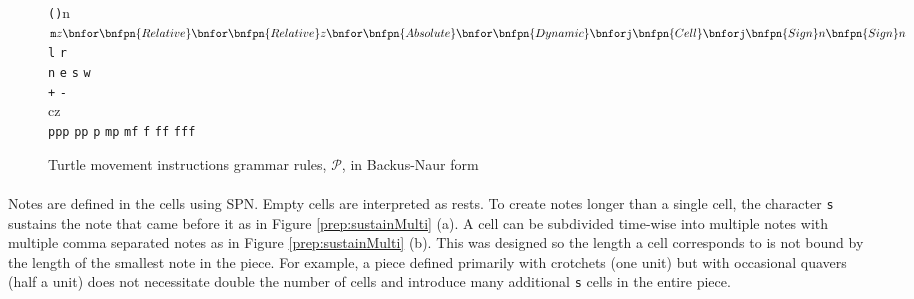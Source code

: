 \newenvironment{bnfsplit}[1][0.7\textwidth]
 {\minipage[t]{#1}$}
 {$\endminipage}

\begin{figure}[ht]
\renewcommand{\models}{::=}
\begin{bnf*}
  {
   }\\
    {
    \bnfor {}
     }\\
   {
   \texttt{(}\texttt{)}n
   \bnfor {}
    }\\
    {
    \begin{bnfsplit}
    \texttt{m}z
    \bnfor \bnfpn{Relative}
    \bnfor \bnfpn{Relative}z
    \bnfor \bnfpn{Absolute}
    \bnfor \bnfpn{Dynamic}
    \\ \bnfor \texttt{j}\bnfpn{Cell}
    \bnfor \texttt{j}\bnfpn{Sign}n\bnfpn{Sign}n
    \end{bnfsplit}
     }\\
     {
     \texttt{l}
     \bnfor \texttt{r}
      }\\
    {
    \texttt{n}
    \bnfor \texttt{e}
    \bnfor \texttt{s}
    \bnfor \texttt{w}
     }\\
   {
   \texttt{+}
   \bnfor \texttt{-}
    }\\
    {
    cz
     }\\
   {
   \texttt{ppp}
   \bnfor \texttt{pp}
   \bnfor \texttt{p}
   \bnfor \texttt{mp}
   \bnfor \texttt{mf}
   \bnfor \texttt{f}
   \bnfor \texttt{ff}
   \bnfor \texttt{fff}
    }\\
\end{bnf*}
\vspace{-35pt}
\caption{Turtle movement instructions grammar rules, $\mathcal{P}$, in Backus-Naur form~\cite{bnf}}
\label{fig:grammar}
\end{figure}

\paragraph{} Notes are defined in the cells using SPN. Empty cells are interpreted as rests. To create notes longer than a single cell, the character \texttt{s} sustains the note that came before it as in Figure \ref{prep:sustainMulti} (a). A cell can be subdivided time-wise into multiple notes with multiple comma separated notes as in Figure \ref{prep:sustainMulti} (b). This was designed so the length a cell corresponds to is not bound by the length of the smallest note in the piece. For example, a piece defined primarily with crotchets (one unit) but with occasional quavers (half a unit) does not necessitate double the number of cells and introduce many additional \texttt{s} cells in the entire piece.

